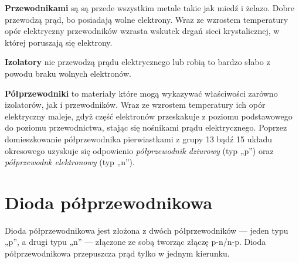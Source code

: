     \textbf{Przewodnikami} są są przede wszystkim metale takie jak miedź i żelazo. Dobre przewodzą prąd, bo posiadają wolne elektrony. Wraz ze wzrostem temperatury opór elektryczny przewodników wzrasta wskutek drgań sieci krystalicznej, w której poruszają się elektrony.

    \textbf{Izolatory} nie przewodzą prądu elektrycznego lub robią to bardzo słabo z powodu braku wolnych elektronów.

    \textbf{Półprzewodniki} to materiały które mogą wykazywać właściwości zarówno izolatorów, jak i przewodników. Wraz ze wzrostem temperatury ich opór elektryczny maleje, gdyż część elektronów przeskakuje z poziomu podstawowego do poziomu przewodnictwa, stając się nośnikami prądu elektrycznego. Poprzez domieszkowanie półprzewodnika pierwiastkami z grupy 13 bądź 15 układu okresowego uzyskuje się odpowienio \emph{półprzewodnik dziurowy} (typ „p”) oraz \emph{półprzewodnk elektronowy} (typ „n”).
  \section{Dioda półprzewodnikowa}
    Dioda półprzewodnikowa jest złożona z dwóch półprzewodników --- jeden typu „p”, a drugi typu „n” --- złączone ze sobą tworząc złączę p-n/n-p. Dioda półprzewodnikowa przepuszcza prąd tylko w jednym kierunku.
